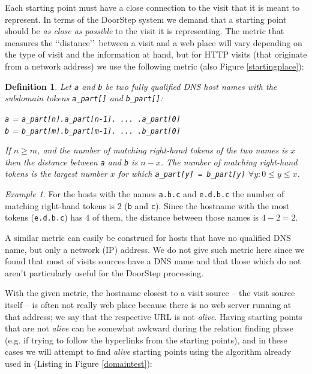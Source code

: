 \documentclass[a4paper]{danarticle}
\newtheorem{definition}{Definition}
\theoremstyle{remark}
\newtheorem*{example}{Example}
\begin{document}
       Each starting point must have a close connection to the visit that it is
       meant to represent. In terms of the DoorStep system we demand that a
       starting point should be \textit{as close as possible} to the visit it is
       representing. The metric that measures the \lq\lq distance\rq\rq\ between
       a visit and a web place will vary depending on the type of visit and the
       information at hand, but for HTTP visits (that originate from a network
       address) we use the following metric (also Figure \ref{startingplace}):
       \begin{definition}
       \label{metric}
       Let \verb$a$ and \verb$b$ be two fully qualified DNS host names with the
       subdomain tokens \verb$a_part[]$ and \verb$b_part[]$:
       \begin{center}
        \verb$a$ = \verb$a_part[n].a_part[n-1]. ... .a_part[0]$\\
        \verb$b$ = \verb$b_part[m].b_part[m-1]. ... .b_part[0]$\\ 
       \end{center}
       If $ n \geq m $, and the number of matching right-hand tokens of the two
       names is $ x $ then the distance between \verb$a$ and \verb$b$ is 
       $ n - x $. The number of matching right-hand tokens is the largest number
       $ x $ for which \verb$a_part[y] = b_part[y]$ $ \forall y : 0 \leq y \leq x $.
       \end{definition}
       \begin{example}
       For the hosts with the names \verb$a.b.c$ and \verb$e.d.b.c$  the number
       of matching right-hand tokens is 2 (\verb$b$ and \verb$c$). Since the
       hostname with the most tokens (\verb$e.d.b.c$) has 4 of them, the distance
       between those names is $ 4 - 2 = 2 $.
       \end{example}
       A similar metric can easily be construed for hosts that have no
       qualified DNS name, but only a network (IP) address. We do not give such
       metric here since we found that most of visits sources have a DNS name
       and that those which do not aren't particularly useful for the DoorStep
       processing.
       
       With the given metric, the hostname closest to a
       visit source -- the visit source itself -- 
       is often not really web place because there is no web server
       running at that address; we say that the respective URL is not
       \textit{alive}. Having starting points that are not \textit{alive} can
       be somewhat awkward during the relation finding phase (e.g. if trying to
       follow the hyperlinks from the starting points), and in these cases we
       will attempt to find \textit{alive} starting points using the algorithm
       already used in \cite{webaware} (Listing in Figure \ref{domaintest}):
       
\end{document}
